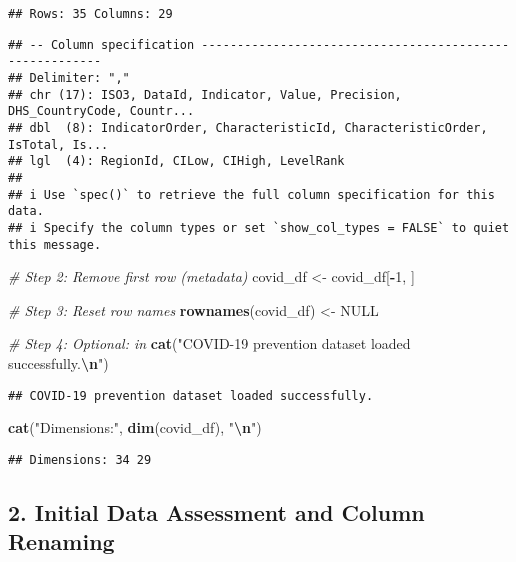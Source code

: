 \documentclass[
]{article}
\newenvironment{Shaded}{\begin{snugshade}}{\end{snugshade}}
\newcommand{\CommentTok}[1]{\textcolor[rgb]{0.56,0.35,0.01}{\textit{#1}}}
\newcommand{\ConstantTok}[1]{\textcolor[rgb]{0.56,0.35,0.01}{#1}}
\newcommand{\DecValTok}[1]{\textcolor[rgb]{0.00,0.00,0.81}{#1}}
\newcommand{\FunctionTok}[1]{\textcolor[rgb]{0.13,0.29,0.53}{\textbf{#1}}}
\newcommand{\NormalTok}[1]{#1}
\newcommand{\OtherTok}[1]{\textcolor[rgb]{0.56,0.35,0.01}{#1}}
\newcommand{\SpecialCharTok}[1]{\textcolor[rgb]{0.81,0.36,0.00}{\textbf{#1}}}
\newcommand{\StringTok}[1]{\textcolor[rgb]{0.31,0.60,0.02}{#1}}
\begin{document}
\begin{verbatim}
## Rows: 35 Columns: 29
\end{verbatim}

\begin{verbatim}
## -- Column specification --------------------------------------------------------
## Delimiter: ","
## chr (17): ISO3, DataId, Indicator, Value, Precision, DHS_CountryCode, Countr...
## dbl  (8): IndicatorOrder, CharacteristicId, CharacteristicOrder, IsTotal, Is...
## lgl  (4): RegionId, CILow, CIHigh, LevelRank
## 
## i Use `spec()` to retrieve the full column specification for this data.
## i Specify the column types or set `show_col_types = FALSE` to quiet this message.
\end{verbatim}

\begin{Shaded}
\begin{Highlighting}[]
\CommentTok{\# Step 2: Remove first row (metadata)}
\NormalTok{covid\_df }\OtherTok{\textless{}{-}}\NormalTok{ covid\_df[}\SpecialCharTok{{-}}\DecValTok{1}\NormalTok{, ]}

\CommentTok{\# Step 3: Reset row names}
\FunctionTok{rownames}\NormalTok{(covid\_df) }\OtherTok{\textless{}{-}} \ConstantTok{NULL}

\CommentTok{\# Step 4: Optional: in}
\FunctionTok{cat}\NormalTok{(}\StringTok{"COVID{-}19 prevention dataset loaded successfully.}\SpecialCharTok{\textbackslash{}n}\StringTok{"}\NormalTok{)}
\end{Highlighting}
\end{Shaded}

\begin{verbatim}
## COVID-19 prevention dataset loaded successfully.
\end{verbatim}

\begin{Shaded}
\begin{Highlighting}[]
\FunctionTok{cat}\NormalTok{(}\StringTok{"Dimensions:"}\NormalTok{, }\FunctionTok{dim}\NormalTok{(covid\_df), }\StringTok{"}\SpecialCharTok{\textbackslash{}n}\StringTok{"}\NormalTok{)}
\end{Highlighting}
\end{Shaded}

\begin{verbatim}
## Dimensions: 34 29
\end{verbatim}

\subsection{2. Initial Data Assessment and Column
Renaming}\label{initial-data-assessment-and-column-renaming}
\end{document}

